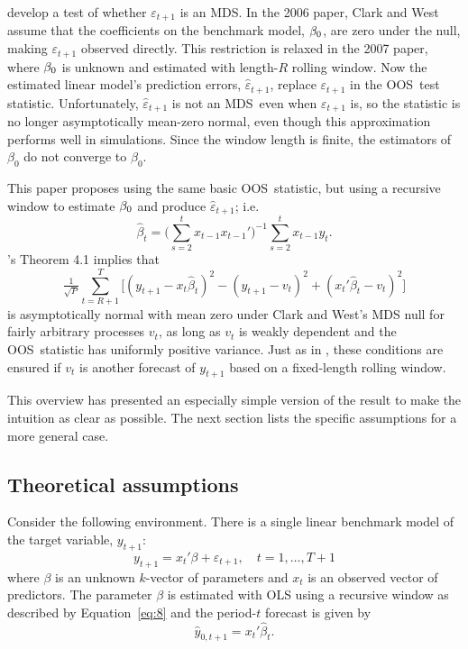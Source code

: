 \documentclass[12pt,fleqn]{article}
\newcommand\citepos[2][]{\citeauthor{#2}'s \citeyearpar[#1]{#2}}
\theoremstyle{definition}
\newcommand{\btrue}[1][]{\if#1*\hat\beta_{T+1}\else\beta_0\fi}
\newcommand{\bh}{\hat{\beta}}
\newcommand{\ep}{\varepsilon}
\newcommand{\eph}{\hat{\varepsilon}}
\newcommand{\yh}{\hat{y}}
\newcommand{\osum}[1]{\sum_{#1=R+1}^T}
\newcommand{\oclt}[1]{\tfrac{1}{\sqrt{P}} \osum{#1}}
\newcommand{\mds}{MDS}
\newcommand{\oos}{OOS}
\begin{document}
\citet{ClW:06,ClW:07} develop a test of whether $\ep_{t+1}$ is
an \mds. In the 2006 paper, Clark and West assume that the
coefficients on the benchmark model, $\btrue$, are zero under the null, making
$\ep_{t+1}$ observed directly. This restriction is relaxed in
the 2007 paper, where $\btrue$ is unknown and estimated with length-$R$
rolling window. Now the estimated linear model's prediction errors,
$\eph_{t+1}$, replace $\ep_{t+1}$ in the \oos\
test statistic. Unfortunately, $\eph_{t+1}$ is not an
\mds\ even when $\ep_{t+1}$ is, so the statistic is no longer
asymptotically mean-zero normal, even though this approximation
performs well in simulations. Since the window length is finite,
the estimators of $\beta_0$ do not converge to $\beta_0$.

This paper proposes using the same basic \oos\ statistic, 
but using a recursive window to estimate $\btrue$ and produce
$\eph_{t+1}$; i.e.
\begin{equation}
  \label{eq:8}
  \bh_t = \Big(\sum_{s=2}^{t} x_{t-1} x_{t-1}'\Big)^{-1}
  \sum_{s=2}^t x_{t-1} y_t.
\end{equation}
\citepos{Wes:96} Theorem 4.1 implies that
\begin{equation*}
  \oclt{t} \Big[(y_{t+1} -
  x_t\bh_t)^2 - (y_{t+1} - v_t)^2 + (x_t'\bh_t - v_t)^2 \Big]
\end{equation*}
is asymptotically normal with mean zero under Clark and West's MDS
null for fairly
arbitrary processes $v_t$, as long as $v_t$ is weakly dependent and
the \oos\ statistic has uniformly positive variance.  Just as in
\citet{ClW:06,ClW:07}, these conditions are ensured if $v_t$ is
another forecast of $y_{t+1}$ based on a fixed-length rolling window.

This overview has presented an especially simple version of the result
to make the intuition as clear as possible. The next section lists the
specific assumptions for a more general case.

\subsection{Theoretical assumptions}
\label{sec:1a}

Consider the following environment. There is a single linear
benchmark model of the target variable, $y_{t+1}$:
\begin{equation}\label{eq:1}
  y_{t+1} = x_t'\beta + \ep_{t+1}, \quad t = 1,\dots,T+1
\end{equation}
where $\beta$ is an unknown $k$-vector of parameters and $x_t$ is an
observed vector of predictors. The parameter $\beta$ is
estimated with OLS using a recursive window as described by
Equation~\eqref{eq:8}
and the period-$t$ forecast is given by
\begin{equation}\label{eq:3}
  \yh_{0,t+1} = x_t'\bh_t.
\end{equation}
\end{document}
